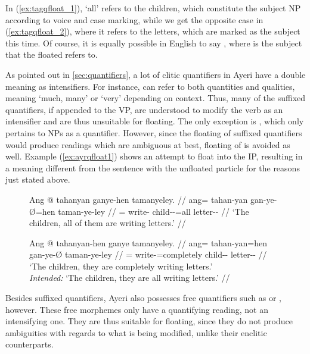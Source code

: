 In (\ref{ex:tagqfloat_1}),  `all' refers to the children, which
constitute the subject NP according to voice and case marking, while we get the
opposite case in (\ref{ex:tagqfloat_2}), where it refers to the letters, which
are marked as the subject this time. Of course, it is equally possible in
English to say , where  is the subject that the floated  refers to.

As pointed out in \autoref{sec:quantifiers}, a lot of clitic quantifiers in
Ayeri have a double meaning as intensifiers. For instance, 
can refer to both quantities and qualities, meaning `much, many' or `very'
depending on context. Thus, many of the suffixed quantifiers, if appended to
the VP, are understood to modify the verb as an intensifier and are thus
unsuitable for floating. The only exception is ,
which only pertains to NPs as a quantifier. However, since the floating of
suffixed quantifiers would produce readings which are ambiguous at best,
floating of  is avoided as well. Example
(\ref{ex:ayrqfloat1}) shows an attempt to float 
into the IP, resulting in a meaning different from the sentence with the
unfloated particle for the reasons just stated above.

\begin{figure}[t]
\pex\label{ex:ayrqfloat1}
\a\label{ex:ayrqfloat1_1}\begingl
	\gla Ang @ tahanyan ganye-hen tamanyeley. //
	\glb ang= tahan-yan gan-ye-Ø=hen taman-ye-ley //
	\glc \AgtT{}= write-\TplM{} child-\Pl{}-\Top{}=all letter-\Pl{}-\PargI{} //
	\glft `The children, all of them are writing letters.' //
\endgl

\a\label{ex:ayrqfloat1_2}\ljudge\excl\begingl
	\gla Ang @ tahanyan-hen ganye tamanyeley. //
	\glb ang= tahan-yan=hen gan-ye-Ø taman-ye-ley //
	\glc \AgtT{}= write-\TplM{}=completely child-\Pl{}-\Top{}
		letter-\Pl{}-\PargI{} //
	\glft `\ques{}The children, they are completely writing letters.'\\
		\textit{Intended:} `The children, they are all writing letters.' //
\endgl

\xe
\end{figure}

Besides suffixed quantifiers, Ayeri also possesses free
quantifiers such as  or ,
however. These free morphemes only have a quantifying reading, not an
intensifying one. They are thus suitable for floating, since they do not produce
ambiguities with regards to what is being modified, unlike their enclitic
counterparts.

